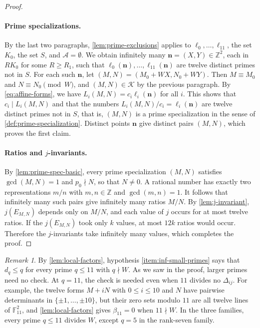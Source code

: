 \documentclass[12pt,oneside,openany]{book}
\theoremstyle{definition}
\theoremstyle{plain}
\numberwithin{equation}{chapter}
\theoremstyle{plain}
\theoremstyle{definition}
\theoremstyle{remark}
\newtheorem{remark}[remark]{Remark}
\newcommand{\Z}{\mathbb Z}
\newcommand{\F}{\mathbb F}
\newcommand{\cK}{\mathcal K}
\begin{document}
\begin{proof}
\paragraph{Prime specializations.} By the last two paragraphs, \cref{lem:prime-exclusions} applies to $\ell_0,\dots,\ell_{11}$, the set $K_0$, the set $S$, and $\mathcal A=\emptyset$. We obtain infinitely many $\mathbf n=(X,Y)\in\Z^2$, each in $RK_0$ for some $R\ge R_1$, such that $\ell_0(\mathbf n),\dots,\ell_{11}(\mathbf n)$ are twelve distinct primes not in $S$. For each such $\mathbf n$, let $(M,N)=(M_0+WX,N_0+WY)$. Then $M\equiv M_0$ and $N\equiv N_0\pmod W$, and $(M,N)\in\cK$ by the previous paragraph. By \eqref{eq:affine-forms}, we have $L_i(M,N)=c_i\ell_i(\mathbf n)$ for all $i$. This shows that $c_i\mid L_i(M,N)$ and that the numbers $L_i(M,N)/c_i=\ell_i(\mathbf n)$ are twelve distinct primes not in $S$, that is, $(M,N)$ is a prime specialization in the sense of \cref{def:prime-specialization}. Distinct points $\mathbf n$ give distinct pairs $(M,N)$, which proves the first claim.

\paragraph{Ratios and $j$-invariants.} By \cref{lem:prime-spec-basic}, every prime specialization $(M,N)$ satisfies $\gcd(M,N)=1$ and $p_0\nmid N$, so that $N\ne0$. A rational number has exactly two representations $m/n$ with $m,n\in\Z$ and $\gcd(m,n)=1$. It follows that infinitely many such pairs give infinitely many ratios $M/N$. By \cref{lem:j-invariant}, $j(E_{M,N})$ depends only on $M/N$, and each value of $j$ occurs for at most twelve ratios. If the $j(E_{M,N})$ took only $k$ values, at most $12k$ ratios would occur. Therefore the $j$-invariants take infinitely many values, which completes the proof.
\end{proof}

\begin{remark}\label{rem:primes-threshold}
By \cref{lem:local-factors}, hypothesis \ref{item:inf-small-primes} says that $d_q\le q$ for every prime $q\le11$ with $q\nmid W$. As we saw in the proof, larger primes need no check. At $q=11$, the check is needed even when $11$ divides no $\Delta_{ij}$. For example, the twelve forms $M+iN$ with $0\le i\le10$ and $N$ have pairwise determinants in $\{\pm1,\dots,\pm10\}$, but their zero sets modulo $11$ are all twelve lines of $\F_{11}^2$, and \cref{lem:local-factors} gives $\beta_{11}=0$ when $11\nmid W$. In the three families, every prime $q\le11$ divides $W$, except $q=5$ in the rank-seven family.
\end{remark}
\end{document}
